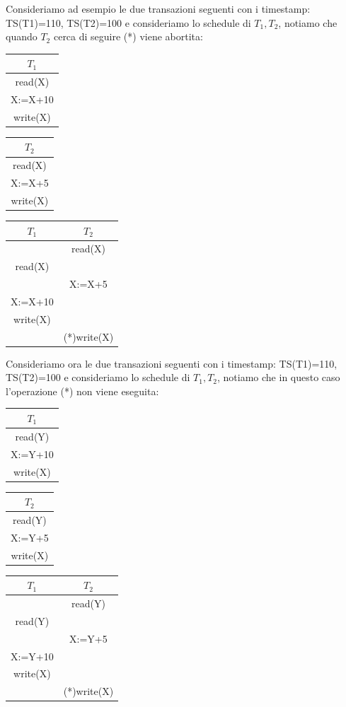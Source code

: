 Consideriamo ad esempio le due transazioni seguenti con i timestamp: TS(T1)=110, TS(T2)=100 e consideriamo lo schedule di $T_1 ,T_2$, notiamo che quando $T_2$ cerca di seguire (*) viene abortita:
\begin{center}
    \begin{tabular}{|c|}
        \hline $T_1$\\\hline
        read(X)\\
        X:=X+10\\
        write(X)\\\hline
    \end{tabular}
    \begin{tabular}{|c|}
        \hline $T_2$\\\hline
        read(X)\\
        X:=X+5\\
        write(X)\\\hline
    \end{tabular}\hspace{1cm}
    \begin{tabular}{|c|c|}
        \hline $T_1$ & $T_2$\\\hline
        & read(X)\\
        read(X)& \\
        & X:=X+5\\
        X:=X+10& \\
        write(X)& \\
        & (*)write(X)\\\hline
    \end{tabular}
\end{center}

Consideriamo ora le due transazioni seguenti con i timestamp: TS(T1)=110, TS(T2)=100 e consideriamo lo schedule di $T_1 ,T_2$, notiamo che in questo caso l’operazione (*) non viene eseguita:
\begin{center}
    \begin{tabular}{|c|}
        \hline $T_1$\\\hline
        read(Y)\\
        X:=Y+10\\
        write(X)\\\hline
    \end{tabular}
    \begin{tabular}{|c|}
        \hline $T_2$\\\hline
        read(Y)\\
        X:=Y+5\\
        write(X)\\\hline
    \end{tabular}\hspace{1cm}
    \begin{tabular}{|c|c|}
        \hline $T_1$ & $T_2$\\\hline
        & read(Y)\\
        read(Y) & \\
        & X:=Y+5\\
        X:=Y+10 & \\
        write(X) & \\
        & (*)write(X)\\\hline
    \end{tabular}
\end{center}